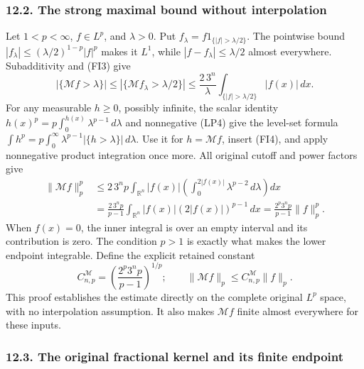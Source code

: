 \documentclass[
  11pt,
]{article}
\makeatletter
\let\ReaderOriginalAnchorStart\hyper@anchorstart
\let\ReaderOriginalAnchorEnd\hyper@anchorend
\let\ReaderPendingAliases\@empty
\def\ReaderArmAliases#1{\gdef\ReaderPendingAliases{#1}}
\def\hyper@anchorstart#1{\ReaderIfNativeAnchorTF{#1}{\ReaderPendingAliases\global\let\ReaderPendingAliases\@empty}{}\ReaderOriginalAnchorStart{#1}}
\makeatother
\begin{document}
\subsubsection{12.2. The strong maximal bound without
interpolation}\label{the-strong-maximal-bound-without-interpolation}

Let \(1<p<\infty\), \(f\in L^p\), and \(\lambda>0\). Put
\(f_\lambda=f1_{\{|f|>\lambda/2\}}\). The pointwise bound
\(|f_\lambda|\leq(\lambda/2)^{1-p}|f|^p\) makes it \(L^1\), while
\(|f-f_\lambda|\leq\lambda/2\) almost everywhere. Subadditivity and
(FI3) give \[
 |\{\mathcal Mf>\lambda\}|
 \leq|\{\mathcal Mf_\lambda>\lambda/2\}|
 \leq\frac{2\,3^n}{\lambda}
                     \int_{\{|f|>\lambda/2\}}|f(x)|\,dx.      \tag{FI4}
\] For any measurable \(h\geq0\), possibly infinite, the scalar identity
\(h(x)^p=p\int_0^{h(x)}\lambda^{p-1}\,d\lambda\) and nonnegative (LP4)
give the level-set formula
\(\int h^p=p\int_0^\infty\lambda^{p-1}|\{h>\lambda\}|\,d\lambda\). Use
it for \(h=\mathcal Mf\), insert (FI4), and apply nonnegative product
integration once more. All original cutoff and power factors give \[
 \begin{split}
 \|\mathcal Mf\|_p^p
 &\leq 2\,3^n p\int_{\mathbb R^n}|f(x)|
          \left(\int_0^{2|f(x)|}\lambda^{p-2}\,d\lambda\right)dx\\
 &=\frac{2\,3^n p}{p-1}\int_{\mathbb R^n}
                    |f(x)|(2|f(x)|)^{p-1}\,dx
   =\frac{2^p3^n p}{p-1}\|f\|_p^p .
 \end{split}                                                   \tag{FI5}
\] When \(f(x)=0\), the inner integral is over an empty interval and its
contribution is zero. The condition \(p>1\) is exactly what makes the
lower endpoint integrable. Define the explicit retained constant \[
 C^{\mathcal M}_{n,p}=\left(\frac{2^p3^n p}{p-1}\right)^{1/p};
 \qquad \|\mathcal Mf\|_p\leq C^{\mathcal M}_{n,p}\|f\|_p.                 \tag{FI6}
\] This proof establishes the estimate directly on the complete original
\(L^p\) space, with no interpolation assumption. It also makes
\(\mathcal Mf\) finite almost everywhere for these inputs.

\ReaderArmAliases{\ReaderOriginalAnchorStart{AN03-LCE-FRAC-003}\ReaderOriginalAnchorEnd\begingroup\expandafter\def\csname @currentHref\endcsname{AN03-LCE-FRAC-003}\label{AN03-LCE-FRAC-003}\endgroup\ReaderOriginalAnchorStart{the-original-fractional-kernel-and-its-finite-endpoint}\ReaderOriginalAnchorEnd}
\subsubsection{12.3. The original fractional kernel and its finite
endpoint}\label{the-original-fractional-kernel-and-its-finite-endpoint}
\end{document}
